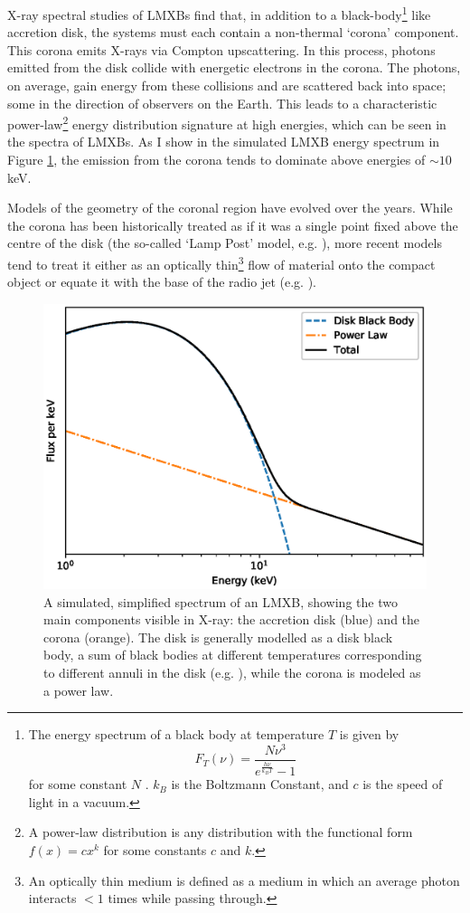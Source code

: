 \par X-ray spectral studies of LMXBs find that, in addition to a black-body\footnote{The energy spectrum of a black body at temperature $T$ is given by \[F_T(\nu)=\frac{N\nu^3}{e^\frac{h\nu}{k_BT}-1}\] for some constant $N$ \citep{Planck}.  $k_B$ is the Boltzmann Constant, and $c$ is the speed of light in a vacuum.} like accretion disk, the systems must each contain a non-thermal `corona' component.  This corona emits X-rays via Compton upscattering.  In this process, photons emitted from the disk collide with energetic electrons in the corona.  The photons, on average, gain energy from these collisions and are scattered back into space; some in the direction of observers on the Earth.  This leads to a characteristic power-law\footnote{A power-law distribution is any distribution with the functional form $f(x)=cx^k$ for some constants $c$ and $k$.} energy distribution signature at high energies, which can be seen in the spectra of LMXBs.  As I show in the simulated LMXB energy spectrum in Figure \ref{fig:toyspec}, the emission from the corona tends to dominate above energies of $\sim10$\,keV.
\par Models of the geometry of the coronal region have evolved over the years.  While the corona has been historically treated as if it was a single point fixed above the centre of the disk (the so-called `Lamp Post' model, e.g. \citealp{Rozanska_Lamppost}), more recent models tend to treat it either as an optically thin\footnote{An optically thin medium is defined as a medium in which an average photon interacts $<1$ times while passing through.} flow of material onto the compact object or equate it with the base of the radio jet (e.g. \citealp{Skipper_CoronaGeo}).

\begin{figure}
   \centering
    \includegraphics[width=0.7\columnwidth, trim = 10mm 0mm 10mm 10mm, clip]{images/toy_spec.eps}
    \captionsetup{singlelinecheck=off}
    \caption[A simulated, simplified spectrum of an LMXB, showing the two main components visible in X-ray: the accretion disk and the corona.]{A simulated, simplified spectrum of an LMXB, showing the two main components visible in X-ray: the accretion disk (blue) and the corona (orange).  The disk is generally modelled as a disk black body, a sum of black bodies at different temperatures corresponding to different annuli in the disk (e.g. \citealp{Mitsuda_diskbb}), while the corona is modeled as a power law.}
   \label{fig:toyspec}
\end{figure}

